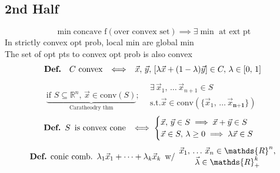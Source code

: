 \documentclass[twocolumn,12pt]{article}    %
\begin{document}
\subsection*{2nd Half}
\begin{equation*}
    \min \text{concave f}(\text{over convex set}) \implies \exists \min \text{ at ext pt}
\end{equation*}
In strictly convex opt prob, local min are global min \\
The set of opt pts to convex opt prob is also convex
\begin{equation*}
    \text{\textbf{Def.}} \hspace{10pt} C \text{  convex} \hspace{5pt} \iff \hspace{5pt} \vec{x},\, \vec{y},\, [\lambda \vec{x} + (1-\lambda)\vec{y}] \in C,\, \lambda \in [0,\,1]
\end{equation*}
\begin{equation*}
        \underbrace{\text{if } S \subseteq \mathds{R}^n, \, \vec{x} \in \text{conv}(S)}_{\text{Caratheodry thm}}; \hspace{10pt} \begin{matrix}
        \exists \, \vec{x}_1,\, \dots\, \vec{x}_{n+1} \in S \\
        \text{s.t.} \vec{x} \in \text{conv}(\{\vec{x}_1,\, \dots\, \vec{x}_{\textbf{n+1}}\})
    \end{matrix}
\end{equation*}
\begin{equation*}
    \text{\textbf{Def.}} \hspace{5pt} S\hspace{5pt}\text{is convex cone} \hspace{5pt} \iff \begin{cases}
        \vec{x},\, \vec{y} \in S \implies \vec{x} + \vec{y} \in S\\
        \vec{x} \in S,\, \lambda \geq 0 \implies \lambda\vec{x} \in S
    \end{cases}
\end{equation*}
\begin{equation*}
    \text{\textbf{Def.} conic comb.}\hspace{5pt} \lambda_1\vec{x}_1  + \dots + \lambda_k\vec{x}_k \hspace{5pt} \text{w/} \hspace{5pt} \begin{matrix}  \vec{x}_1,\, \dots \, \vec{x}_n \in \mathds{R}^n,\\ \vec{\lambda} \in \mathds{R}_+^k \end{matrix}
\end{equation*}
\end{document}

